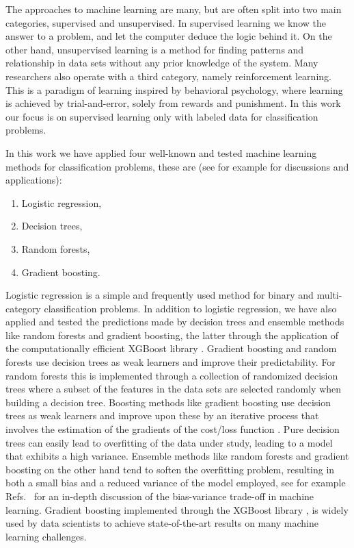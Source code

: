 \documentclass[superscriptaddress,unsortedaddress,
 amsmath,amssymb,
 aps,
]{revtex4-2}
\begin{document}
The approaches to machine learning are many, but are often split into two main categories, supervised and unsupervised. In supervised learning we know the answer to a problem, and let the computer deduce the logic behind it. On the other hand, unsupervised learning is a method for finding patterns and relationship in data sets without any prior knowledge of the system. Many researchers also operate with a third category, namely reinforcement learning. This is a paradigm of learning inspired by behavioral psychology, where learning is achieved by trial-and-error, solely from rewards and punishment. In this work our focus is on supervised learning only with labeled data for classification problems.

In this work we have applied four well-known and tested machine learning methods for classification problems, these are (see for example \cite{Hastie2009,Mehta2019} for discussions and applications):
\begin{enumerate}
    \item Logistic regression,
    \item Decision trees,
    \item Random forests,
    \item Gradient boosting.
\end{enumerate}
Logistic regression \cite{Hastie2009} is a simple and frequently used method for binary and multi-category classification problems.  In addition to logistic regression, we have also applied and tested the predictions made by decision trees and ensemble methods like random forests and gradient boosting, the latter through the application of the computationally efficient  XGBoost library \cite{xgboost2016}. Gradient boosting and random forests use decision trees as weak learners and improve their predictability. For random forests this is implemented through a collection of randomized decision trees where a  subset of the features in the data sets are selected randomly when building a decision tree. Boosting methods like gradient boosting use decision trees as  weak learners and improve upon these by an iterative process that involves the estimation of the gradients of the cost/loss function \cite{Hastie2009}. Pure decision trees can easily lead to overfitting of the data under study, leading to a model that exhibits a high variance. Ensemble methods like random forests and gradient boosting on the other hand tend to soften the overfitting problem, resulting in both a small bias and a reduced variance of the model employed, see for example Refs.~\cite{Hastie2009,Mehta2019} for an in-depth discussion of the bias-variance trade-off in machine learning. Gradient boosting implemented through the  XGBoost library \cite{xgboost2016}, is widely used by data scientists to achieve state-of-the-art results on many machine learning challenges.
\end{document}
